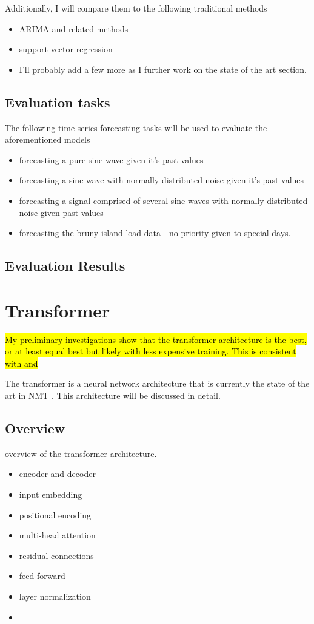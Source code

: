 Additionally, I will compare them to the following traditional methods
\begin{itemize}
	\item ARIMA and related methods
	\item support vector regression
	\item I'll probably add a few more as I further work on the state of the art section.
\end{itemize}

\subsection{Evaluation tasks}
The following time series forecasting tasks will be used to evaluate the aforementioned models
\begin{itemize}
	\item forecasting a pure sine wave given it's past values
	\item forecasting a sine wave with normally distributed noise given it's past values
	\item forecasting a signal comprised of several sine waves with normally distributed noise given past values
	\item forecasting the bruny island load data - no priority given to special days.
\end{itemize}

\subsection{Evaluation Results}

\section{Transformer}
\hl{My preliminary investigations show that the transformer architecture is the best, or at least equal best but likely with less expensive training. This is consistent with \protect\cite{Song2017} and \protect\cite{Vaswani2017}}\\
\par
The transformer is a neural network architecture that is currently the state of the art in NMT \citep{Vaswani2017}.
This architecture will be discussed in detail. 

\subsection{Overview}
overview of the transformer architecture.
\begin{itemize}
	\item encoder and decoder
	\item input embedding
	\item positional encoding
	\item multi-head attention
	\item residual connections
	\item feed forward
	\item layer normalization
	\item 
\end{itemize}

